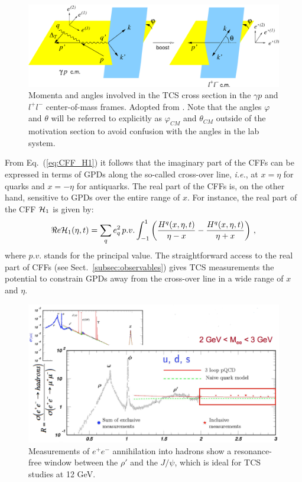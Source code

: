 \begin{figure}[t]
\begin{center}
\includegraphics[scale=0.4]{Angle.eps}
\caption{\small{Momenta and angles involved in the TCS cross section in the
$\gamma p$ and $l^{+} l^{-}$ center-of-mass frames. Adopted from
\cite{Berger:2001xd}. Note that the angles $\varphi$ and $\theta$ will be
referred to explicitly as $\varphi_{CM}$ and $\theta_{CM}$ outside of the
motivation section to avoid confusion with the angles in the lab system.}}
\label{fig:Angle}
\end{center}
\end{figure}

From Eq.~(\ref{eq:CFF_H1}) it follows that the imaginary part of the CFFs can
be expressed in terms of GPDs along the so-called cross-over line,
\textit{i.e.}, at $x=\eta$ for quarks and $x=-\eta$ for antiquarks. The real
part of the CFFs is, on the other hand, sensitive to GPDs over the entire range
of $x$. For instance, the real part of the CFF ${\cal H}_1$ is given by:
\begin{equation}
\Re e {\cal H}_1(\eta,t) = \sum_q e_q^2 \, p.v.\int^{1}_{-1} \left(\frac{H^q (x,\eta,t)}{\eta-x}
  -\frac{H^q (x,\eta,t)}{\eta+x}\right) \,,
\label{eq:ReH1}
\end{equation}
where $p.v.$ stands for the principal value. The straightforward access to
the real part of CFFs (see Sect.~\ref{subsec:observables}) gives TCS
measurements the potential to constrain GPDs away from the cross-over line
in a wide range of $x$ and $\eta$.

\begin{figure}[t]
\includegraphics[width=125mm]{ee_to_hadrons.eps}
\caption{\small{Measurements of $e^+e^-$ annihilation into hadrons show a
resonance-free window between the $\rho'$ and the $J/\psi$, which is ideal
for TCS studies at 12 GeV.}}
\label{fig:ee_to_hadrons}
\end{figure}

